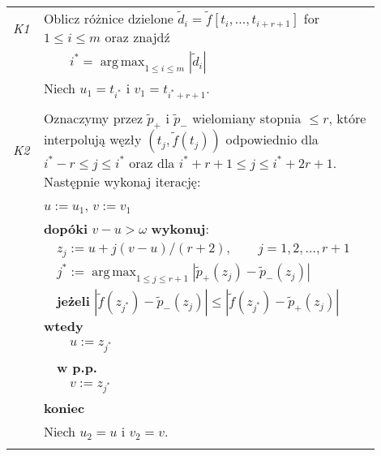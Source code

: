 \documentclass[oik, pdftex, robocza, man]{mgrwms}
\DeclareMathOperator*{\argmax}{arg\,max}
\begin{document}
    \vspace{10pt}
    \noindent
    \begin{tabular}{p{0.045\linewidth} p{0.85\linewidth}}        
        \textit{K1} & Oblicz różnice dzielone $\tilde{d}_i = \tilde{f}[t_i, \ldots, t_{i+r+1}]$ for $1 \leq i \leq m $ oraz znajdź \\
                        & \(\displaystyle \qquad i^* = \argmax_{1 \leq i \leq m }|\tilde{d}_i| \)  \\
                        & Niech $u_1 = t_{i^*}$ i $v_1 = t_{i^* + r + 1}$. \\
                        & \\

        \textit{K2} & Oznaczymy przez $\tilde{p}_+$ i $\tilde{p}_-$ wielomiany stopnia $ \leq r$, które interpolują węzły $(t_j, \tilde{f}(t_j))$ odpowiednio dla $i^* - r \leq j \leq i^*$ oraz dla $i^* + r + 1 \leq j \leq i^* + 2r + 1$. Następnie wykonaj iterację: \\
                        & $u := u_1$, $v := v_1$ \\
                        & \textbf{dopóki} $v-u > \omega$ \textbf{wykonuj}: \\
                        & $\quad$$z_j := u + j(v-u) / (r+2), \qquad j = 1, 2, \ldots, r + 1$ \\
                        & $\quad$\(\displaystyle j^* := \argmax_{1 \leq j \leq r + 1}|\tilde{p}_{+}(z_j) - \tilde{p}_{-}(z_j)| \) \\
                        & $\quad$\textbf{jeżeli} $|\tilde{f}(z_{j^*}) - \tilde{p}_{-}(z_j)| \leq |\tilde{f}(z_{j^*}) - \tilde{p}_{+}(z_j)|$ \textbf{wtedy} \\
                        & $\quad\quad$$u:= z_{j^*}$ \\
                        & $\quad$\textbf{w p.p.} \\
                        & $\quad\quad$$v:= z_{j^*}$ \\
                        & \textbf{koniec} \\
                        & Niech $u_2 = u$ i $v_2 = v$. \\
                        & \\


\end{tabular}
\end{document}
